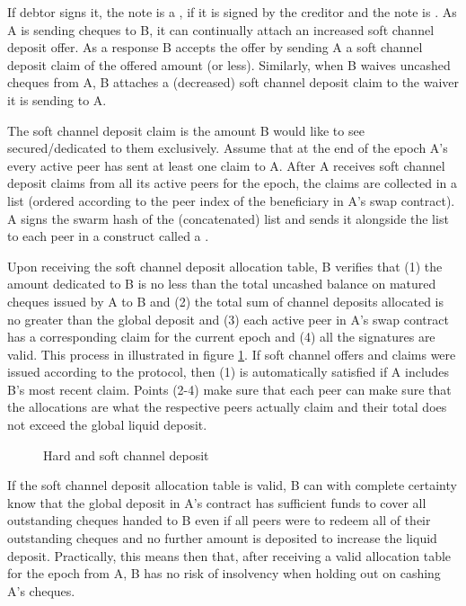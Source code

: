 If debtor signs it, the note is a , if it is signed by the creditor and the note is . As A is sending cheques to B, it can continually attach an increased soft channel deposit offer. As a response B accepts the offer by sending A a soft channel deposit claim of the offered amount (or less). Similarly, when B waives uncashed cheques from A, B attaches a (decreased) soft channel deposit claim to the waiver it is sending to A.

The soft channel deposit claim is the amount B would like to see secured/dedicated to them exclusively.
Assume that at the end of the epoch A's every  active peer has sent at least one claim to A.
After A receives soft channel deposit claims from all its active peers for the epoch, the claims are collected in a list (ordered according to the peer index of the beneficiary in A's swap contract). A signs the swarm hash of the (concatenated) list and sends it alongside the list to each peer
in a construct called a .

Upon receiving the soft channel deposit allocation table, B verifies that
(1) the amount dedicated to B is no less than the total uncashed balance on matured cheques issued by A to B and
(2) the total sum of channel deposits allocated is no greater than the global deposit and
(3) each active peer in A's swap contract has a corresponding claim for the current epoch and 
(4) all the signatures are valid.
This process in illustrated in figure \ref{fig:softchanneldeposit}.
If soft channel offers and claims were issued according to the protocol, then (1) is automatically satisfied if A includes B's most recent claim. Points (2-4) make sure that each peer can make sure that the allocations are what the respective peers actually claim and their total does not exceed the global liquid deposit.

\begin{center}
\begin{figure}
\begin{center}
\begin{tikzpicture}
\end{tikzpicture}
\end{center}
\caption{Hard and soft channel deposit}
\label{fig:softchanneldeposit}
\end{figure}
\end{center}


If the soft channel deposit allocation table is valid, B can with complete certainty know that the global deposit in A's contract has sufficient funds to cover all outstanding cheques handed to B even if all peers were to redeem all of their outstanding cheques and no further amount is deposited to increase the liquid deposit.
Practically, this means then that, after receiving a valid allocation table for the epoch from A, B has no risk of insolvency when holding out on cashing A's cheques. 

